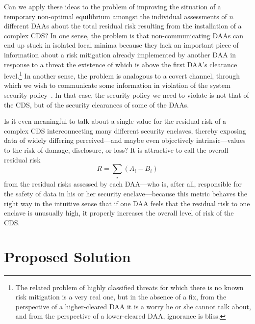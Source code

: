 \documentclass{llncs}
\begin{document}
Can we apply these ideas to the problem of improving the situation of a
temporary non-optimal equilibrium amongst the individual assessments
of $n$ different DAAs about the total residual risk resulting from the
installation of a complex CDS?  In one sense, the problem is that
non-communicating DAAs can end up stuck in isolated local minima
because they lack an important piece of information
about a risk mitigation
already implemented by another DAA in response to a threat the existence
of which is above the first DAA's clearance level.\footnote{The related problem
of highly classified
threats for which there is no known risk mitigation is a very real one,
but in the absence of a fix, from the perspective of a higher-cleared
DAA it is a worry he or she cannot talk about, and from the perspective of a
lower-cleared DAA, ignorance is bliss.}  In another sense, the problem
is analogous to a covert channel, through which we wish to communicate
some information in violation of the system security policy~\cite{NCSC-TG-030}.
In that case, the security policy we need to violate is not that of the CDS, but of
the security clearances of some of the DAAs.

Is it even meaningful to talk about a single value for the residual risk
of a complex CDS interconnecting many different security enclaves, thereby
exposing data of widely differing perceived---and maybe even objectively
intrinsic---values to the risk of damage, disclosure, or loss?  It is
attractive to call the overall residual risk
\begin{equation}
R = \sum_i (A_i - B_i)
\end{equation}
from the residual risks assessed by each DAA---who is, after all,
responsible
for the safety of data in his or her security enclave---because this metric behaves
the right way in the intuitive sense that if one DAA feels that the residual
risk to one enclave is unusually high, it properly increases the overall
level of risk of the CDS.

\section{Proposed Solution}
\end{document}
